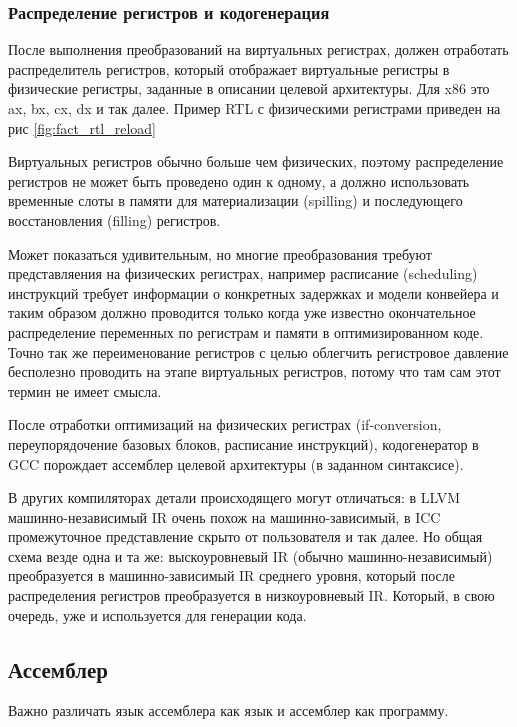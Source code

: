 \documentclass[a4paper,12pt,oneside]{article}
\begin{document}
\subsubsection{Распределение регистров и кодогенерация}\label{subsubsec:PRTrans}

После выполнения преобразований на виртуальных регистрах, должен отработать распределитель регистров, который отображает виртуальные регистры в физические регистры, заданные в описании целевой архитектуры. Для x86 это ax, bx, cx, dx и так далее. Пример RTL с физическими регистрами приведен на рис \ref{fig:fact_rtl_reload}

Виртуальных регистров обычно больше чем физических, поэтому распределение регистров не может быть проведено один к одному, а должно использовать временные слоты в памяти для материализации (spilling) и последующего восстановления (filling) регистров.

Может показаться удивительным, но многие преобразования требуют представляения на физических регистрах, например расписание (scheduling) инструкций требует информации о конкретных задержках и модели конвейера и таким образом должно проводится только когда уже известно окончательное распределение переменных по регистрам и памяти в оптимизированном коде. Точно так же переименование регистров с целью облегчить регистровое давление бесполезно проводить на этапе виртуальных регистров, потому что там сам этот термин не имеет смысла.

После отработки оптимизаций на физических регистрах (if-conversion, переупорядочение базовых блоков, расписание инструкций), кодогенератор в GCC порождает ассемблер целевой архитектуры (в заданном синтаксисе).

В других компиляторах детали происходящего могут отличаться: в LLVM машинно-независимый IR очень похож на машинно-зависимый, в ICC промежуточное представление скрыто от пользователя и так далее. Но общая схема везде одна и та же: выскоуровневый IR (обычно машинно-независимый) преобразуется в машинно-зависимый IR среднего уровня, который после распределения регистров преобразуется в низкоуровневый IR. Который, в свою очередь, уже и используется для генерации кода.

\pagebreak
\subsection{Ассемблер}\label{subsec:Assembler}

Важно различать язык ассемблера как язык и ассемблер как программу. 
\end{document}
